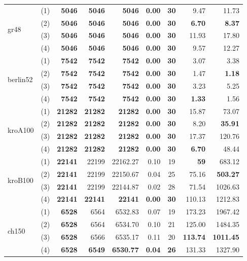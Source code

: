 \documentclass[runningheads]{llncs}
\begin{document}
{\begin{longtable}{l c r r r r c r r}
\multirow{4}{*}{gr48}
 & (1) & \textbf{5046} & \textbf{5046} & \textbf{5046} & \textbf{0.00} & \textbf{30} & 9.47 & 11.73 \\
 & (2) & \textbf{5046} & \textbf{5046} & \textbf{5046} & \textbf{0.00} & \textbf{30} & \textbf{6.70} & \textbf{8.37} \\
 & (3) & \textbf{5046} & \textbf{5046} & \textbf{5046} & \textbf{0.00} & \textbf{30} & 11.93 & 17.80 \\
 & (4) & \textbf{5046} & \textbf{5046} & \textbf{5046} & \textbf{0.00} & \textbf{30} & 9.57 & 12.27 \\
\midrule

\multirow{4}{*}{berlin52}
 & (1) & \textbf{7542} & \textbf{7542} & \textbf{7542} & \textbf{0.00} & \textbf{30} & 3.07 & 3.38 \\
 & (2) & \textbf{7542} & \textbf{7542} & \textbf{7542} & \textbf{0.00} & \textbf{30} & 1.47 & \textbf{1.18} \\
 & (3) & \textbf{7542} & \textbf{7542} & \textbf{7542} & \textbf{0.00} & \textbf{30} & 3.23 & 5.25 \\
 & (4) & \textbf{7542} & \textbf{7542} & \textbf{7542} & \textbf{0.00} & \textbf{30} & \textbf{1.33} & 1.56 \\
\midrule

\multirow{4}{*}{kroA100}
 & (1) & \textbf{21282} & \textbf{21282} & \textbf{21282} & \textbf{0.00} & \textbf{30} & 15.87 & 73.07 \\
 & (2) & \textbf{21282} & \textbf{21282} & \textbf{21282} & \textbf{0.00} & \textbf{30} & 8.20 & \textbf{35.91} \\
 & (3) & \textbf{21282} & \textbf{21282} & \textbf{21282} & \textbf{0.00} & \textbf{30} & 17.37 & 120.76 \\
 & (4) & \textbf{21282} & \textbf{21282} & \textbf{21282} & \textbf{0.00} & \textbf{30} & \textbf{6.70} & 48.44 \\
\midrule

\multirow{4}{*}{kroB100}
 & (1) & \textbf{22141} & 22199 & 22162.27 & 0.10 & 19 & \textbf{59} & 683.12 \\
 & (2) & \textbf{22141} & 22199 & 22150.67 & 0.04 & 25 & 75.16 & \textbf{503.27} \\
 & (3) & \textbf{22141} & 22199 & 22144.87 & 0.02 & 28 & 71.54 & 1026.63 \\
 & (4) & \textbf{22141} & \textbf{22141} & \textbf{22141} & \textbf{0.00} & \textbf{30} & 110.13 & 1212.83 \\
\midrule

\multirow{4}{*}{ch150}
 & (1) & \textbf{6528} & 6564 & 6532.83 & 0.07 & 19 & 173.23 & 1967.42 \\
 & (2) & \textbf{6528} & 6564 & 6534.70 & 0.10 & 21 & 125.00 & 1484.35 \\
 & (3) & \textbf{6528} & 6566 & 6535.17 & 0.11 & 20 & \textbf{113.74} & \textbf{1011.45} \\
 & (4) & \textbf{6528} & \textbf{6549} & \textbf{6530.77} & \textbf{0.04} & \textbf{26} & 131.33 & 1327.90 \\


\end{longtable}}
\end{document}
